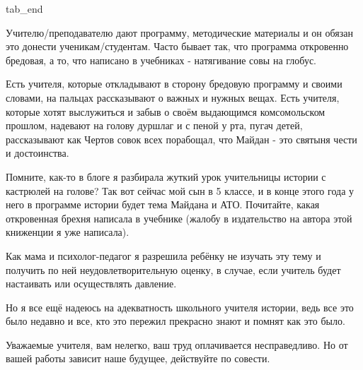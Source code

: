   tab_end
\fi

Учителю/преподавателю дают программу, методические материалы и он обязан это
донести ученикам/студентам. Часто бывает так, что программа откровенно
бредовая, а то, что написано в учебниках - натягивание совы на глобус. 

Есть учителя, которые откладывают в сторону бредовую программу и своими
словами, на пальцах рассказывают о важных и нужных вещах. Есть учителя, которые
хотят выслужиться и забыв о своём выдающимся комсомольском прошлом, надевают на
голову дуршлаг и с пеной у рта, пугач детей, рассказывают как Чертов совок всех
порабощал, что Майдан - это святыня чести и достоинства. 

Помните, как-то в блоге я разбирала жуткий урок учительницы истории с кастрюлей
на голове? Так вот сейчас мой сын в 5 классе, и в конце этого года у него в
программе истории будет тема Майдана и АТО. Почитайте, какая откровенная брехня
написала в учебнике (жалобу в издательство на автора этой книженции я уже
написала).

Как мама и психолог-педагог я разрешила ребёнку не изучать эту тему и получить
по ней неудовлетворительную оценку, в случае, если учитель будет настаивать или
осуществлять давление. 

Но я все ещё надеюсь на адекватность школьного учителя истории, ведь все это
было недавно и все, кто это пережил прекрасно знают и помнят как это было.

Уважаемые учителя, вам нелегко, ваш труд оплачивается несправедливо. Но от
вашей работы зависит наше будущее, действуйте по совести.

